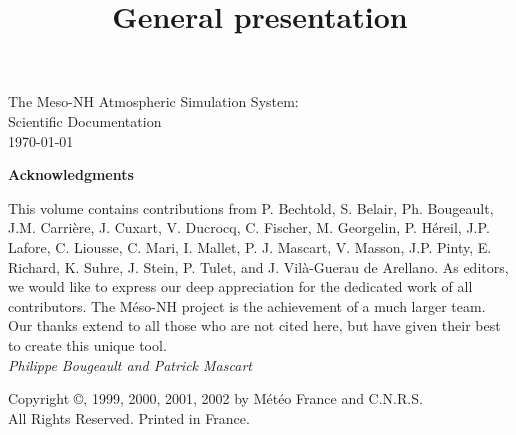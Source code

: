 \documentclass[12pt]{book}
\begin{document}
\title{General presentation}
\dominitoc
\begin{figure}[h]
\hspace*{10cm} 
\end{figure}
\vspace{5cm}
\begin{center}
\huge
The Meso-NH Atmospheric Simulation System:\\ Scientific Documentation
\\[1cm]

\large
\today
\end{center}
\newpage

\vspace{7cm}
\begin{center}
\bf     Acknowledgments
\end{center}
\normalsize
\vspace{2cm}

This volume contains contributions from P. Bechtold, S. Belair,
Ph. Bougeault, J.M. Carri\`ere, J. Cuxart, V. Ducrocq,
C. Fischer, M. Georgelin, P. H\'ereil, J.P. Lafore, C. Liousse, C. Mari,
I. Mallet, P. J. Mascart, V. Masson, J.P. Pinty, E. Richard, K. Suhre,
J. Stein, P. Tulet, and J. Vil\`a-Guerau de Arellano.
As editors, we would like to express our deep appreciation for
the dedicated work of all contributors. The M\'eso-NH project is the
achievement of a much larger team. Our thanks extend to all those who are
not cited here, but have given their best to create this unique tool.\\

{\em Philippe Bougeault and Patrick Mascart}

\vspace{14cm}

Copyright \copyright{}, 1999, 2000, 2001, 2002 by M\'et\'eo France
and C.N.R.S. \\
All Rights Reserved. Printed in France.



\end{document}
